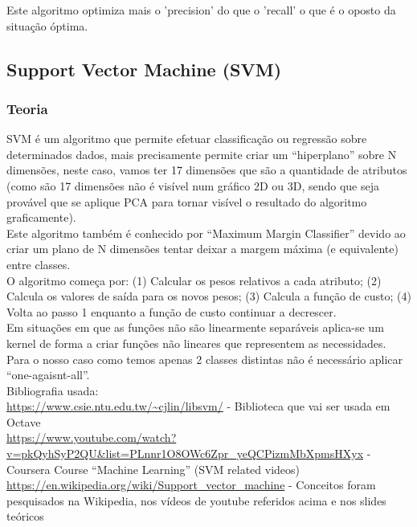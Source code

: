 \documentclass[portugues,final]{revdetua}
\begin{document}
Este algoritmo optimiza mais o 'precision' do que o 'recall' o que é o oposto da situação óptima.

\subsection{Support Vector Machine (SVM)}

\subsubsection{Teoria}
SVM é um algoritmo que permite efetuar classificação ou regressão sobre determinados dados, mais precisamente permite criar um “hiperplano” sobre N dimensões, neste caso, vamos ter 17 dimensões que são a quantidade de atributos (como são 17 dimensões não é visível num gráfico 2D ou 3D, sendo que seja provável que se aplique PCA para tornar visível o resultado do algoritmo graficamente).\\

Este algoritmo também é conhecido por “Maximum Margin Classifier” devido ao criar um plano de N dimensões tentar deixar a margem máxima (e equivalente) entre classes.\\

O algoritmo começa por: (1) Calcular os pesos relativos a cada atributo; (2) Calcula os valores de saída para os novos pesos; (3) Calcula a função de custo; (4) Volta ao passo 1 enquanto a função de custo continuar a decrescer.\\

Em situações em que as funções não são linearmente separáveis aplica-se um kernel de forma a criar funções não lineares que representem as necessidades.\\

Para o nosso caso como temos apenas 2 classes distintas não é necessário aplicar “one-agaisnt-all”.\\

Bibliografia usada:\\
\url{https://www.csie.ntu.edu.tw/~cjlin/libsvm/} - Biblioteca que vai ser usada em Octave\\
\url{https://www.youtube.com/watch?v=pkQyhSyP2QU&list=PLnnr1O8OWc6Zpr_yeQCPizmMbXpmsHXyx} - Coursera Course “Machine Learning” (SVM related videos)\\
\url{https://en.wikipedia.org/wiki/Support_vector_machine} - Conceitos foram pesquisados na Wikipedia, nos vídeos de youtube referidos acima e nos slides teóricos
\end{document}
